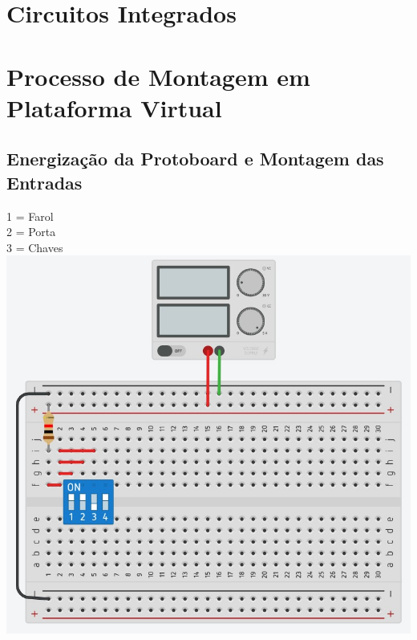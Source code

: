\documentclass[]{article}
\begin{document}
	\section{Circuitos Integrados}
	\section{Processo de Montagem em Plataforma Virtual}
		\subsection{Energização da Protoboard e Montagem das Entradas}
			1 = Farol \\ 2 = Porta \\ 3 = Chaves \\
			\includegraphics[scale=0.6]{Images/Tinkercad 01.jpg} \\
\end{document}
